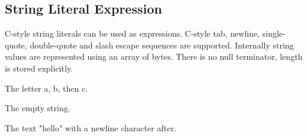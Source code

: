 
\subsection{String Literal Expression}
{
	C-style string literals can be used as expressions.
	C-style tab, newline, single-quote, double-quote and slash escape sequences
	are supported. Internally string values are represented using an array of
	bytes. There is no null terminator, length is stored explicitly.
	
	\begin{itemize}
	{
		\item[\texttt{"abc"}] The letter a, b, then c.
		
		\item[\texttt{""}] The empty string.
		
		\item[\texttt{"hello\symbol{92}n"}] The text "hello" with a newline
			character after.
	}
	\end{itemize}
}
